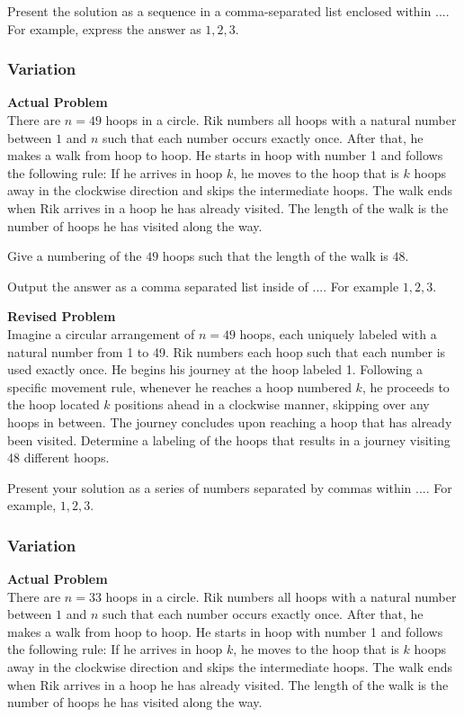 Present the solution as a sequence in a comma-separated list enclosed within $\boxed{...}$. For example, express the answer as $\boxed{1, 2, 3}$.

\subsubsection{Variation}
\textbf{Actual Problem}\\
There are $n = 49$ hoops in a circle. Rik numbers all hoops with a natural number between $1$ and $n$ such that each number occurs exactly once. After that, he makes a walk from hoop to hoop. He starts in hoop with number 1 and follows the following rule: If he arrives in hoop $k$, he moves to the hoop that is $k$ hoops away in the clockwise direction and skips the intermediate hoops. The walk ends when Rik arrives in a hoop he has already visited. The length of the walk is the number of hoops he has visited along the way.

Give a numbering of the $49$ hoops such that the length of the walk is $48$.

Output the answer as a comma separated list inside of $\boxed{...}$. For example $\boxed{1, 2, 3}$.

\textbf{Revised Problem}\\
Imagine a circular arrangement of $n = 49$ hoops, each uniquely labeled with a natural number from 1 to 49. Rik numbers each hoop such that each number is used exactly once. He begins his journey at the hoop labeled 1. Following a specific movement rule, whenever he reaches a hoop numbered $k$, he proceeds to the hoop located $k$ positions ahead in a clockwise manner, skipping over any hoops in between. The journey concludes upon reaching a hoop that has already been visited. Determine a labeling of the hoops that results in a journey visiting 48 different hoops.

Present your solution as a series of numbers separated by commas within $\boxed{...}$. For example, $\boxed{1, 2, 3}$.

\subsubsection{Variation}
\textbf{Actual Problem}\\
There are $n = 33$ hoops in a circle. Rik numbers all hoops with a natural number between $1$ and $n$ such that each number occurs exactly once. After that, he makes a walk from hoop to hoop. He starts in hoop with number 1 and follows the following rule: If he arrives in hoop $k$, he moves to the hoop that is $k$ hoops away in the clockwise direction and skips the intermediate hoops. The walk ends when Rik arrives in a hoop he has already visited. The length of the walk is the number of hoops he has visited along the way.

